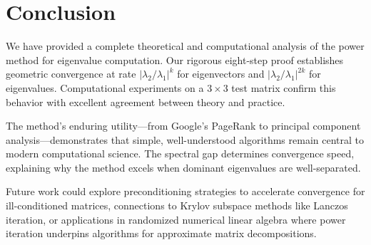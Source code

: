 \documentclass[11pt,a4paper]{article}
\begin{document}
\section{Conclusion}

We have provided a complete theoretical and computational analysis of the power method for eigenvalue computation. Our rigorous eight-step proof establishes geometric convergence at rate $|\lambda_2/\lambda_1|^k$ for eigenvectors and $|\lambda_2/\lambda_1|^{2k}$ for eigenvalues. Computational experiments on a $3 \times 3$ test matrix confirm this behavior with excellent agreement between theory and practice.

The method's enduring utility—from Google's PageRank to principal component analysis—demonstrates that simple, well-understood algorithms remain central to modern computational science. The spectral gap determines convergence speed, explaining why the method excels when dominant eigenvalues are well-separated.

Future work could explore preconditioning strategies to accelerate convergence for ill-conditioned matrices, connections to Krylov subspace methods like Lanczos iteration, or applications in randomized numerical linear algebra where power iteration underpins algorithms for approximate matrix decompositions.
\end{document}
